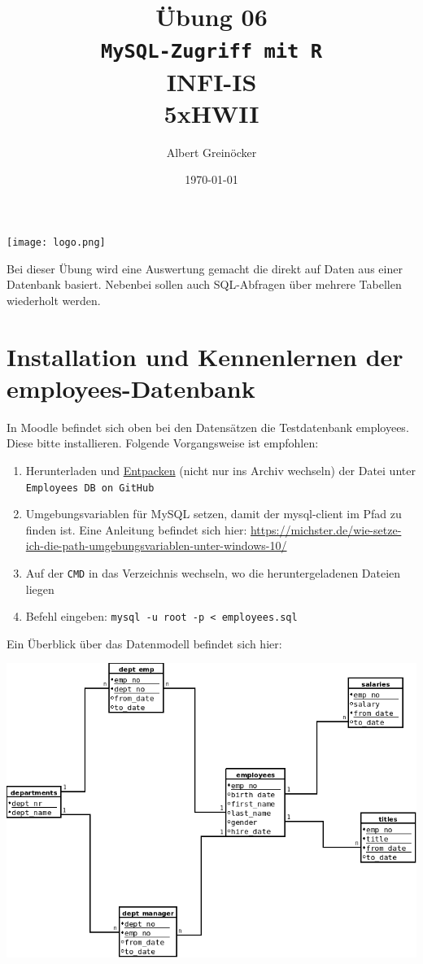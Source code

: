 \documentclass{article}
\title{Übung 06 \\ \texttt{MySQL-Zugriff mit R}  \\ INFI-IS \\ 5xHWII}
\author{Albert Greinöcker}
\date{\today} %
\begin{document}
	
	\maketitle %
	
	\begin{center}
		
		\texttt{[image: logo.png]}
	\end{center}
	\vspace{1cm}


Bei dieser Übung wird eine Auswertung gemacht die direkt auf Daten aus einer Datenbank basiert. Nebenbei sollen auch SQL-Abfragen über mehrere Tabellen wiederholt werden.

\section{Installation und Kennenlernen der employees-Datenbank}

In Moodle befindet sich oben bei den Datensätzen die Testdatenbank employees. Diese bitte installieren. Folgende Vorgangsweise ist empfohlen:

\begin{enumerate}
	\item Herunterladen und \underline{Entpacken} (nicht nur ins Archiv wechseln) der Datei unter \texttt{Employees DB on GitHub}
	\item Umgebungsvariablen für MySQL setzen, damit der mysql-client im Pfad zu finden ist. Eine Anleitung befindet sich hier: \url{https://michster.de/wie-setze-ich-die-path-umgebungsvariablen-unter-windows-10/}
	\item Auf der \texttt{CMD} in das Verzeichnis wechseln, wo die heruntergeladenen Dateien liegen
	\item Befehl eingeben: \texttt{mysql -u root -p < employees.sql} \\
	
\end{enumerate}

Ein Überblick über das Datenmodell befindet sich hier: 

\includegraphics[width=17cm]{employees.png}
\end{document}
